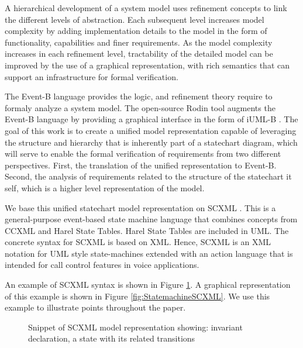 \documentclass{easychair}
\begin{document}
A hierarchical development of a system model uses 
refinement concepts to link the different levels
of abstraction. Each subsequent level increases model 
complexity by adding implementation details to the 
model in the form of functionality, capabilities and 
finer requirements. As the model complexity increases 
in each refinement level, tractability of the detailed 
model can be improved by the use of a graphical representation, 
with rich semantics that can support an infrastructure 
for formal verification.

The Event-B language \cite{abrial10:_model_event_b} provides the logic, and refinement
theory require to formaly analyze a system model. The 
open-source Rodin tool \cite{abrial10:_rodin} augments the Event-B language by 
providing a graphical interface in the form of
iUML-B \cite{snook14:_b_statem}. The goal of this work is to create a unified model 
representation capable of leveraging the structure and 
hierarchy that is inherently part of a statechart 
diagram, which will serve to enable the formal verification
of requirements from two different perspectives. First, 
the translation of the unified representation to Event-B. Second,
the analysis of requirements related to the structure of 
the statechart it self, which is a higher level representation 
of the model. 

We base this unified statechart model representation 
on SCXML  \cite{scxmlwebsite}.  This is a general-purpose event-based state machine 
language that combines concepts from CCXML and Harel 
State Tables. Harel State Tables are included in UML. 
The concrete syntax for SCXML
is based on XML. Hence, SCXML is an XML notation for 
UML style state-machines extended with an action 
language that is intended for call control features 
in voice applications.

An example of SCXML syntax is shown in Figure \ref{fig:scxml}. 
A graphical representation of this example is shown in Figure  \ref{fig:StatemachineSCXML}. 
We use this example to illustrate points throughout the paper.


% 


\begin{figure}[tbp!]
  \caption{Snippet of SCXML model representation showing: invariant declaration, a state with its related transitions} 
  \label{fig:scxml}
\end{figure}
\end{document}
